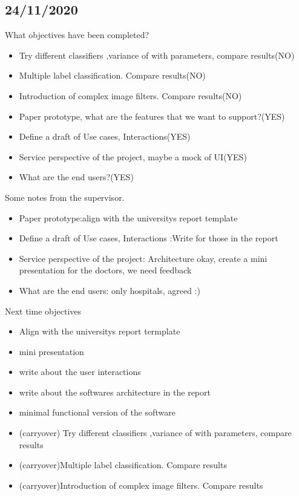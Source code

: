 \documentclass[openany]{article}
\begin{document}
		\subsection{24/11/2020}
			What objectives have been completed?
			\begin{itemize}
				\item Try different classifiers ,variance of with parameters, compare results(NO)
				\item Multiple label classification. Compare results(NO)
				\item Introduction of complex image filters. Compare results(NO)
				\item Paper prototype, what are the features that we want to support?(YES)
				\item Define a draft of Use cases, Interactions(YES)
				\item Service perspective of the project, maybe a mock of UI(YES)
				\item What are the end users?(YES)
			\end{itemize}
			Some notes from the supervisor. 
			\begin{itemize}
				\item Paper prototype:align with the universitys report template
				\item Define a draft of Use cases, Interactions :Write for those in the report
				\item Service perspective of the project: Architecture okay, create a mini presentation for the doctors, we need feedback
				\item What are the end users: only hospitals, agreed :) 
			\end{itemize}
			Next time objectives
			\begin{itemize}
				\item Align with the universitys report termplate
				\item mini presentation
				\item write about the user interactions
				\item write about the softwares architecture in the report
				\item minimal functional version of the software
				\item (carryover) Try different classifiers ,variance of with parameters, compare results
				\item (carryover)Multiple label classification. Compare results
				\item (carryover)Introduction of complex image filters. Compare results
			\end{itemize}
\end{document}
